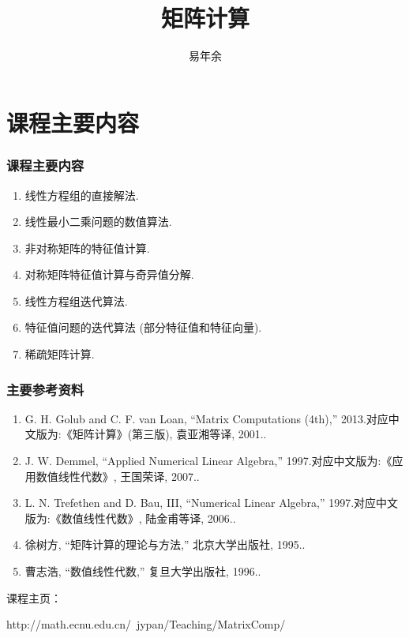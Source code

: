 \documentclass[notheorems,serif]{beamer}
\begin{document}
\title[数值线性代数]{{\small{}~~~~~~~~~~~~~~~~~~~~~~~~~~~~~~~~~~~~~~~~~~~~~~
~~~~~~~~~~~} \\
矩阵计算
}




\author[]{~~易年余~~}

\institute[湘潭大学数学系]

\date[\today]




\frame[plain]{\titlepage}


\section{课程主要内容}

\begin{frame}
\frametitle{课程主要内容}
\begin{enumerate}
	\item { 线性方程组的直接解法}.
	\item { 线性最小二乘问题的数值算法}.
	\item { 非对称矩阵的特征值计算}.
	\item { 对称矩阵特征值计算与奇异值分解}.
	\item { 线性方程组迭代算法}.
	\item { 特征值问题的迭代算法 (部分特征值和特征向量)}. 
	\item { 稀疏矩阵计算}.  
\end{enumerate}
\end{frame}

\begin{frame}
\frametitle{主要参考资料}
\begin{enumerate}
	\item { G. H. Golub and C. F. van Loan, “Matrix Computations (4th),” 2013.对应中文版为:《矩阵计算》(第三版), 袁亚湘等译, 2001.}.
	\item { J. W. Demmel, “Applied Numerical Linear Algebra,” 1997.对应中文版为:《应用数值线性代数》, 王国荣译, 2007.}.
	\item { L. N. Trefethen and D. Bau, III, “Numerical Linear Algebra,” 1997.对应中文版为:《数值线性代数》, 陆金甫等译, 2006.}.
	\item { 徐树方, “矩阵计算的理论与方法,” 北京大学出版社, 1995.}.
	\item { 曹志浩, “数值线性代数,” 复旦大学出版社, 1996.}. 
\end{enumerate}

课程主页：

\qquad  http://math.ecnu.edu.cn/~jypan/Teaching/MatrixComp/

\end{frame}
\end{document}
